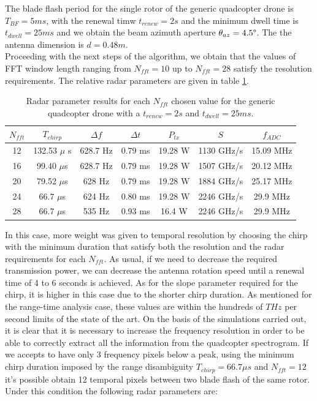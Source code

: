 The blade flash period for the single rotor of the generic quadcopter drone is $T_{BF} = 5 ms$, with the renewal timw $t_{renew} = 2 s$ and the minimum dwell time is $t_{dwell} = 25 ms$ and we obtain the beam azimuth aperture $\theta_{az} = 4.5\degree$. The the antenna dimension is $d = 0.48m$.\\
Proceeding with the next steps of the algorithm, we obtain that the values of FFT window length ranging from $N_{fft} = 10$ up to $N_{fft}= 28$ satisfy the resolution requirements. The relative radar parameters are given in table \ref{tab:ftquadresult}.

\begin{table}[h!]
\centering
\begin{tabular}{|c|c|c|c|c|c|c|}
\hline
$N_{fft}$ & $T_{chirp}$ & $\Delta f$ & $\Delta t$ & $P_{tx}$ & $S$ & $f_{ADC}$ \\ \hline
12 & 132.53 $\mu$ s & 628.7 Hz & 0.79 ms & 19.28 W & 1130 GHz/s & 15.09 MHz \\ \hline
16 & 99.40 $\mu$s & 628.7 Hz & 0.79 ms & 19.28 W & 1507 GHz/s & 20.12 MHz \\ \hline
20 & 79.52 $\mu$s & 628 Hz & 0.79 ms & 19.28 W & 1884 GHz/s & 25.17 MHz \\ \hline
24 & 66.7 $\mu$s & 624 Hz & 0.80 ms & 19.28 W & 2246 GHz/s & 29.9 MHz \\ \hline
28 & 66.7 $\mu$s & 535 Hz & 0.93  ms & 16.4 W & 2246 GHz/s & 29.9 MHz \\ \hline
\end{tabular}
\caption{Radar parameter results for each $N_{fft}$ chosen value for the generic quadcopter drone  with a $t_{renew} = 2s$ and $t_{dwell} = 25ms$.}
\label{tab:ftquadresult}
\end{table}

In this case, more weight was given to temporal resolution by choosing the chirp with the minimum duration that satisfy both the resolution and the radar requirements for each $N_{fft}$. 
As usual, if we need to decrease the required transmission power, we can decrease the antenna rotation speed until a renewal time of 4 to 6 seconds is achieved. As for the slope parameter required for the chirp, it is higher in this case due to the shorter chirp duration. As mentioned for the range-time analysis case, these values are within the hundreds of $THz$ per second limits of the state of the art.
On the basis of the simulations carried out, it is clear that it is necessary to increase the frequency resolution in order to be able to correctly extract all the information from the quadcopter spectrogram. If we accepts to have only 3 frequency pixels below a peak, using the minimum chirp duration imposed by the range disambiguity $T_{chirp} = 66.7 \mu s$ and $N_{fft} = 12$ it's possible obtain 12 temporal pixels between two blade flash of the same rotor. Under this condition the following radar parameters are:

